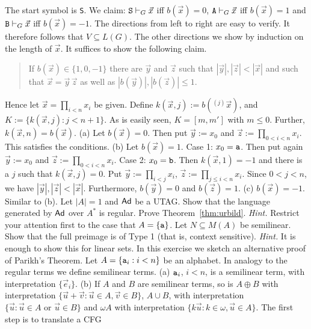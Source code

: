 The start symbol is {\tt S}. We claim:
$\mbox{\tt S} \vdash_G \vec{x}$ iff $b(\vec{x}) = 0$,
$\mbox{\tt A} \vdash_G \vec{x}$ iff
$b(\vec{x}) = 1$ and $\mbox{\tt B} \vdash_G \vec{x}$ iff
$b(\vec{x}) = - 1$. The directions from left to right are
easy to verify. It therefore follows that
$V \subseteq L(G)$. The other directions we show by induction
on the length of $\vec{x}$. It suffices to show the following
claim.
\begin{quote}
If $b(\vec{x}) \in \{1,0,-1\}$ there are
$\vec{y}$ and $\vec{z}$ such that $|\vec{y}|, |\vec{z}| <
|\vec{x}|$ and such that $\vec{x} = \vec{y}\,\vec{z}$ as well as
$|b(\vec{y})|, |b(\vec{z})| \leq 1$.
\end{quote}
Hence let $\vec{x} = \prod_{i < n} x_i$  be given.
Define $k(\vec{x}, j) := b(^{(j)}\vec{x})$,
and $K := \{k(\vec{x}, j) : j < n+1\}$. As is easily seen,
$K = [m,m']$ with $m \leq 0$.
Further, $k(\vec{x},n) = b(\vec{x})$. (a) Let $b(\vec{x}) = 0$.
Then put $\vec{y} := x_0$ and $\vec{z} :=
\prod_{0 < i < n} x_i$. This satisfies the conditions.
(b) Let $b(\vec{x}) = 1$. Case 1: $x_0 = \mbox{\tt a}$.
Then put again $\vec{y} := x_0$ and $\vec{z} :=
\prod_{0 < i < n} x_i$. Case 2: $x_0 = \mbox{\tt b}$.
Then $k(\vec{x},1) = -1$ and there is a $j$ such that
$k(\vec{x}, j) = 0$. Put $\vec{y} := \prod_{i < j} x_i$,
$\vec{z} := \prod_{j \leq i < n} x_i$.  Since $0 < j < n$,
we have $|\vec{y}|, |\vec{z}| < |\vec{x}|$.
Furthermore, $b(\vec{y}) = 0$ and $b(\vec{z}) = 1$. (c)
$b(\vec{x}) = -1$. Similar to (b).
\proofend
\vplatz
\exercise
Let $|A| = 1$ and $\textsf{A}\textsf{d}$ be a UTAG. Show that the language 
generated by $\textsf{A}\textsf{d}$ over $A^{\ast}$ is regular.
\vplatz
\exercise
Prove Theorem~\ref{thm:urbild}. {\it Hint.} Restrict
your attention first to the case that $A = \{\mbox{\tt a}\}$.
\vplatz
\exercise
Let $N \subseteq M(A)$ be semilinear. Show that the full
preimage is of Type 1 (that is, context sensitive).
{\it Hint.} It is enough to show this for linear sets.
\vplatz
\exercise
In this exercise we sketch an alternative proof of Parikh's Theorem.
Let $A = \{\mbox{\tt a}_i : i < n\}$ be an alphabet. In analogy to the
regular terms we define semilinear terms. (a) $\mbox{\tt a}_i$, $i < n$,
is a semilinear term, with interpretation $\{\vec{e}_i\}$. (b) If
$A$ and $B$ are semilinear terms, so is $A \oplus B$ with
interpretation $\{\vec{u} + \vec{v} : \vec{u} \in A,
\vec{v} \in B\}$, $A \cup B$, with interpretation $\{\vec{u} :
\vec{u} \in A \mbox{ or }\vec{u} \in B\}$ and
$\omega A$ with interpretation $\{k \vec{u} : k \in \omega,
\vec{u} \in A\}$. The first step is to translate a CFG
